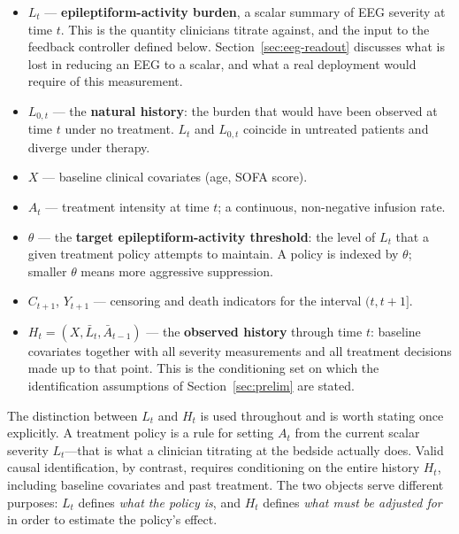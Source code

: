 \begin{itemize}\setlength{\itemsep}{2pt}
\item $L_t$ --- \textbf{epileptiform-activity burden}, a scalar summary of EEG severity at time $t$.
This is the quantity clinicians titrate against, and the input to the feedback controller defined
below. Section~\ref{sec:eeg-readout} discusses what is lost in reducing an EEG to a scalar, and what
a real deployment would require of this measurement.

\item $L_{0,t}$ --- the \textbf{natural history}: the burden that would have been observed at time
$t$ under no treatment. $L_t$ and $L_{0,t}$ coincide in untreated patients and diverge under
therapy.

\item $X$ --- baseline clinical covariates (age, SOFA score).

\item $A_t$ --- treatment intensity at time $t$; a continuous, non-negative infusion rate.

\item $\theta$ --- the \textbf{target epileptiform-activity threshold}: the level of $L_t$ that a
given treatment policy attempts to maintain. A policy is indexed by $\theta$; smaller $\theta$ means
more aggressive suppression.

\item $C_{t+1}$, $Y_{t+1}$ --- censoring and death indicators for the interval $(t,t+1]$.

\item $H_t = (X, \bar{L}_t, \bar{A}_{t-1})$ --- the \textbf{observed history} through time $t$:
baseline covariates together with all severity measurements and all treatment decisions made up to
that point. This is the conditioning set on which the identification assumptions of
Section~\ref{sec:prelim} are stated.
\end{itemize}

The distinction between $L_t$ and $H_t$ is used throughout and is worth stating once explicitly. A
treatment policy is a rule for setting $A_t$ from the current scalar severity $L_t$---that is what a
clinician titrating at the bedside actually does. Valid causal identification, by contrast, requires
conditioning on the entire history $H_t$, including baseline covariates and past treatment. The two
objects serve different purposes: $L_t$ defines \emph{what the policy is}, and $H_t$ defines
\emph{what must be adjusted for} in order to estimate the policy's effect.

